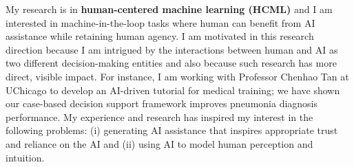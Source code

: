 


My research is in \textbf{human-centered machine learning (HCML)} and I am interested in machine-in-the-loop tasks where human can benefit from AI assistance while retaining human agency. 
I am motivated in this research direction because I am intrigued by the interactions between human and AI as two different decision-making entities and also because such research has more direct, visible impact. 
For instance, I am working with Professor Chenhao Tan at UChicago to develop an AI-driven tutorial for medical training; we have shown our case-based decision support framework improves pneumonia diagnosis performance.
My experience and research has inspired my interest in the following problems: 
(i) generating AI assistance that inspires appropriate trust and reliance on the AI
and
(ii) using AI to model human perception and intuition.
\\